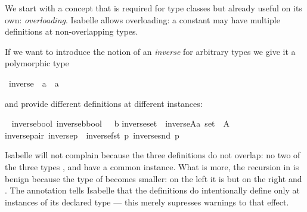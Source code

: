 %
\begin{isabellebody}%
\def\isabellecontext{Overloading{\isadigit{0}}}%
%
\begin{isamarkuptext}%
We start with a concept that is required for type classes but already
useful on its own: \emph{overloading}. Isabelle allows overloading: a
constant may have multiple definitions at non-overlapping types.%
\end{isamarkuptext}%
%
%
\begin{isamarkuptext}%
If we want to introduce the notion of an \emph{inverse} for arbitrary types we
give it a polymorphic type%
\end{isamarkuptext}%
\ inverse\ {\isacharcolon}{\isacharcolon}\ {\isachardoublequote}{\isacharprime}a\ {\isasymRightarrow}\ {\isacharprime}a{\isachardoublequote}%
\begin{isamarkuptext}%
\noindent
and provide different definitions at different instances:%
\end{isamarkuptext}%
\ {\isacharparenleft}\isanewline
inverse{\isacharunderscore}bool{\isacharcolon}\ {\isachardoublequote}inverse{\isacharparenleft}b{\isacharcolon}{\isacharcolon}bool{\isacharparenright}\ {\isasymequiv}\ {\isasymnot}\ b{\isachardoublequote}\isanewline
inverse{\isacharunderscore}set{\isacharcolon}\ \ {\isachardoublequote}inverse{\isacharparenleft}A{\isacharcolon}{\isacharcolon}{\isacharprime}a\ set{\isacharparenright}\ {\isasymequiv}\ {\isacharminus}A{\isachardoublequote}\isanewline
inverse{\isacharunderscore}pair{\isacharcolon}\ {\isachardoublequote}inverse{\isacharparenleft}p{\isacharparenright}\ {\isasymequiv}\ {\isacharparenleft}inverse{\isacharparenleft}fst\ p{\isacharparenright}{\isacharcomma}\ inverse{\isacharparenleft}snd\ p{\isacharparenright}{\isacharparenright}{\isachardoublequote}%
\begin{isamarkuptext}%
\noindent
Isabelle will not complain because the three definitions do not overlap: no
two of the three types ,  and  have a
common instance. What is more, the recursion in  is
benign because the type of  becomes smaller: on the
left it is  but on the right  and
. The annotation \isa{{\isacharparenleft}}\isa{{\isacharparenright}} tells Isabelle that
the definitions do intentionally define  only at
instances of its declared type  --- this merely supresses
warnings to that effect.


\end{isamarkuptext}
\end{isabellebody}
